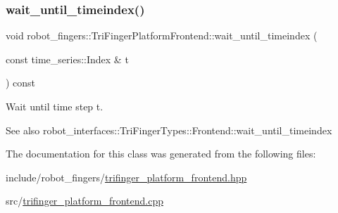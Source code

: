 \subsubsection{\texorpdfstring{wait\+\_\+until\+\_\+timeindex()}{wait\_until\_timeindex()}}
{\footnotesize\ttfamily void robot\+\_\+fingers\+::\+Tri\+Finger\+Platform\+Frontend\+::wait\+\_\+until\+\_\+timeindex (\begin{DoxyParamCaption}\item[{const time\+\_\+series\+::\+Index \&}]{t }\end{DoxyParamCaption}) const}



Wait until time step t. 

\begin{DoxySeeAlso}{See also}
robot\+\_\+interfaces\+::\+Tri\+Finger\+Types\+::\+Frontend\+::wait\+\_\+until\+\_\+timeindex 
\end{DoxySeeAlso}


The documentation for this class was generated from the following files\+:\begin{DoxyCompactItemize}
\item 
include/robot\+\_\+fingers/\hyperlink{trifinger__platform__frontend_8hpp}{trifinger\+\_\+platform\+\_\+frontend.\+hpp}\item 
src/\hyperlink{trifinger__platform__frontend_8cpp}{trifinger\+\_\+platform\+\_\+frontend.\+cpp}\end{DoxyCompactItemize}
